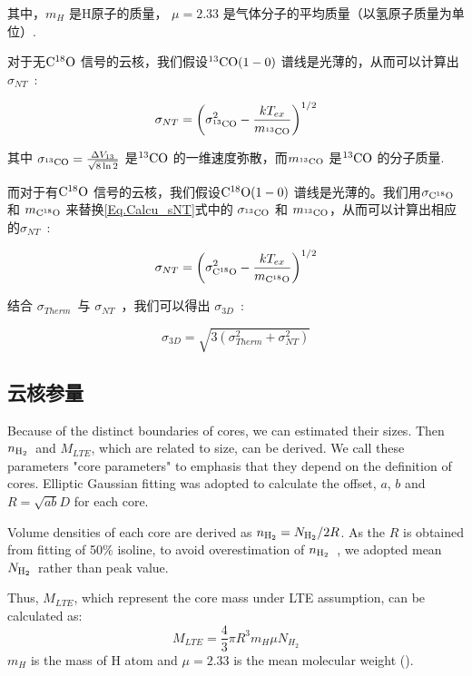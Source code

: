 \documentclass[UTF8, nocolorlinks]{pkuthss}
\newcommand{\cob}{$\rm ^{13}CO$ }
\newcommand{\coc}{$\rm C^{18}O$ }
\newcommand{\cobb}{$\rm^{13}CO(1-0)$ }
\newcommand{\cocc}{$\rm C^{18}O(1-0)$ }
\newcommand{\nhyd}{$N_{\rm H_2}$\ }
\newcommand{\nnhyd}{$n_{\rm H_2}$\ }
\newcommand{\sigmath}{$\sigma _{Therm}$\ }
\newcommand{\sigmant}{$\sigma _{NT}$\ }
\newcommand{\sigmatd}{$\sigma _{3D}$\ }
\begin{document}
      		其中，$m_H$ 是H原子的质量， $\mu=2.33 $ 是气体分子的平均质量\supercite{2008A&A...487..993K}（以氢原子质量为单位）. 

      		对于无\coc 信号的云核，我们假设\cobb 谱线是光薄的，从而可以计算出\sigmant :

      		\begin{equation}\label{Eq.Calcu_sNT}
      		   \sigma_{NT}=\left(\sigma ^2 _{^{13}{\rm CO}}- \frac{kT_{ex}}{m_{^{13}{\rm CO}}} \right)^{		1/2}
      		\end{equation}

      		其中 $\sigma _{^{13}{\rm CO}} = \frac{\Delta V_{13}}{\sqrt{8\ln2}}$ 是\cob 的一维速度弥散，而$m_{^{13}{\rm CO}}$ 是\cob 的分子质量.

      		而对于有\coc 信号的云核，我们假设\cocc 谱线是光薄的。我们用$\sigma _{\rm C^{18}O}$ 和 $m_{\rm C^{18}O}$ 来替换\ref{Eq.Calcu_sNT}式中的 $\sigma_{^{13}{\rm CO}}$ 和 ${m_{^{13}{\rm CO}}}$，从而可以计算出相应的\sigmant :

      		 \begin{equation}\label{Eq.Calcu_sNT2}
      		   \sigma_{NT}=\left(\sigma ^2 _{{\rm C^{18}O}}- \frac{kT_{ex}}{m_{{\rm C^{18}O}}} \right)^{		1/2}
      		\end{equation}
		
      		结合 \sigmath 与 \sigmant ，我们可以得出 \sigmatd :

      		\begin{equation}
      		   \sigma_{3D}=\sqrt{3(\sigma _{Therm}^2+\sigma _{NT}^2)}
      		\end{equation}

		\subsection{云核参量}

			

		Because of the distinct boundaries of cores, we can estimated their sizes. Then \nnhyd and $M_{LTE}$, which are related to size, can be derived. We call these parameters "core parameters" to emphasis that they depend on the definition of cores. Elliptic Gaussian fitting was adopted to calculate the offset, $a$, $b$ and $R=\sqrt{ab}D$ for each core.

      	Volume densities of each core are derived as $n_{\rm H_2}=N_{\rm H_2} /2R$. As the $R$ is obtained  from fitting of 50\% isoline, to avoid overestimation of \nnhyd, we adopted mean \nhyd rather than peak value.

      	Thus, $M_{LTE}$, which represent the core mass under LTE assumption, can be calculated as:
      	\begin{equation}
         M_{LTE}=\frac{4}{3}\pi R^3 m_H \mu N_{H_2}
      	\end{equation}
      	$m_H$ is the mass of H atom and $\mu=2.33$ is the mean molecular weight (\citealt{2008A&A...487..993K}).
\end{document}
